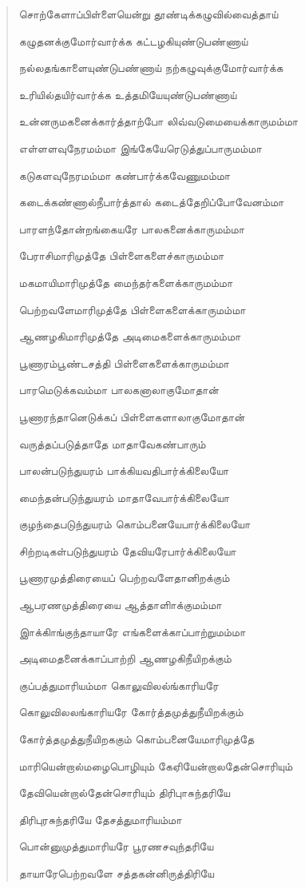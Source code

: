 \documentclass{article}
\begin{document}
\begin{quotation}
{சொற்கேளாப்பிள்ளையென்று தூண்டிக்கழுவில்வைத்தாய்

கழுதனக்குமோர்வார்க்க கட்டழகியுண்டுபண்ணாய்

நல்லதங்காளையுண்டுபண்ணாய் நற்கழுவுக்குமோர்வார்க்க

உரியில்தயிர்வார்க்க உத்தமியேயுண்டுபண்ணாய்

உன்னருமகனைக்கார்த்தாற்போ லிவ்வடுமையைக்காருமம்மா

எள்ளளவுநேரமம்மா இங்கேயேரெடுத்துப்பாருமம்மா

கடுகளவுநேரமம்மா கண்பார்க்கவேணுமம்மா

கடைக்கண்ணால்நீபார்த்தால் கடைத்தேறிப்போவேனம்மா

பாரளந்தோன்றங்கையரே பாலகனைக்காருமம்மா

பேராசிமாரிமுத்தே பிள்ளைகளைச்காருமம்மா

மகமாயிமாரிமுத்தே மைந்தர்களைக்காருமம்மா

பெற்றவளேமாரிமுத்தே பிள்ளைகளைக்காருமம்மா

ஆணழகிமாரிமுத்தே அடிமைகளைக்காருமம்மா

பூணாரம்பூண்டசத்தி பிள்ளைகளைக்காருமம்மா

பாரமெடுக்கவம்மா பாலகனாலாகுமோதான்

பூணாரந்தானெடுக்கப் பிள்ளைகளாலாகுமோதான்

வருத்தப்படுத்தாதே மாதாவேகண்பாரும்

பாலன்படுந்துயரம் பாக்கியவதிபார்க்கிலையோ

மைந்தன்படுந்துயரம் மாதாவேபார்க்கிலையோ

குழந்தைபடுந்துயரம் கொம்பனையேபார்க்கிலையோ

சிற்றடிகள்படுந்துயரம் தேவியரேபார்க்கிலையோ

பூணாரமுத்திரையைப் பெற்றவளேதானிறக்கும்

ஆபரணமுத்திரையை ஆத்தாளிாக்குமம்மா

இாக்கிாங்குந்தாயாரே எங்களைக்காப்பாற்றுமம்மா

அடிமைதனைக்காப்பாற்றி ஆணழகிநீயிறக்கும்

குப்பத்துமாரியம்மா கொலுவிலல்ங்காரியரே

கொலுவிலலங்காரியரே கோர்த்தமுத்துநீயிறக்கும்

கோர்த்தமுத்துநீயிறககும் கொம்பனையேமாரிமுத்தே

மாரியென்றால்மழைபொழியும் கேஏியேன்றாலதேன்சொரியும்

தேவியென்றால்தேன்சொரியும் திரிபுாசுந்தரியே

திரிபுரசுந்தரியே தேசத்துமாரியம்மா

பொன்னுமுத்துமாரியரே பூரணசவுந்தரியே

தாயாரேபெற்றவளே சத்தகன்னிருத்திரியே

}
\end{quotation}
\end{document}
